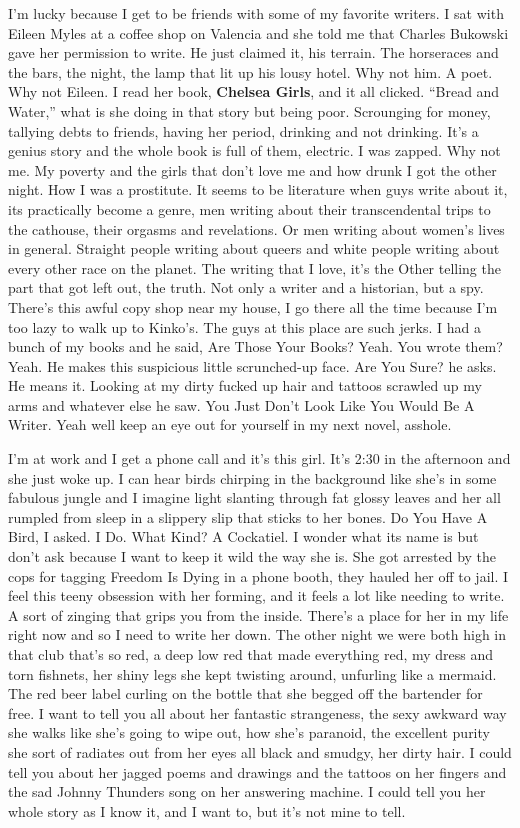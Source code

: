 I'm lucky because I get to be friends with some of my favorite writers.
I sat with Eileen Myles at a coffee shop on Valencia and she told me
that Charles Bukowski gave her permission to write. He just claimed it,
his terrain. The horseraces and the bars, the night, the lamp that lit
up his lousy hotel. Why not him. A poet. Why not Eileen. I read her
book, \textbf{Chelsea Girls}, and it all clicked. ``Bread and Water,''
what is she doing in that story but being poor. Scrounging for money,
tallying debts to friends, having her period, drinking and not drinking.
It's a genius story and the whole book is full of them, electric. I was
zapped. Why not me. My poverty and the girls that don't love me and how
drunk I got the other night. How I was a prostitute. It seems to be
literature when guys write about it, its practically become a genre, men
writing about their transcendental trips to the cathouse, their orgasms
and revelations. Or men writing about women's lives in general. Straight
people writing about queers and white people writing about every other
race on the planet. The writing that I love, it's the Other telling the
part that got left out, the truth. Not only a writer and a historian,
but a spy. There's this awful copy shop near my house, I go there all
the time because I'm too lazy to walk up to Kinko's. The guys at this
place are such jerks. I had a bunch of my books and he said, Are Those
Your Books? Yeah. You wrote them? Yeah. He makes this suspicious little
scrunched-up face. Are You Sure? he asks. He means it. Looking at my
dirty fucked up hair and tattoos scrawled up my arms and whatever else
he saw. You Just Don't Look Like You Would Be A Writer. Yeah well keep
an eye out for yourself in my next novel, asshole.

I'm at work and I get a phone call and it's this girl. It's 2:30 in the
afternoon and she just woke up. I can hear birds chirping in the
background like she's in some fabulous jungle and I imagine light
slanting through fat glossy leaves and her all rumpled from sleep in a
slippery slip that sticks to her bones. Do You Have A Bird, I asked. I
Do. What Kind? A Cockatiel. I wonder what its name is but don't ask
because I want to keep it wild the way she is. She got arrested by the
cops for tagging Freedom Is Dying in a phone booth, they hauled her off
to jail. I feel this teeny obsession with her forming, and it feels a
lot like needing to write. A sort of zinging that grips you from the
inside. There's a place for her in my life right now and so I need to
write her down. The other night we were both high in that club that's so
red, a deep low red that made everything red, my dress and torn
fishnets, her shiny legs she kept twisting around, unfurling like a
mermaid. The red beer label curling on the bottle that she begged off
the bartender for free. I want to tell you all about her fantastic
strangeness, the sexy awkward way she walks like she's going to wipe
out, how she's paranoid, the excellent purity she sort of radiates out
from her eyes all black and smudgy, her dirty hair. I could tell you
about her jagged poems and drawings and the tattoos on her fingers and
the sad Johnny Thunders song on her answering machine. I could tell you
her whole story as I know it, and I want to, but it's not mine to tell.


